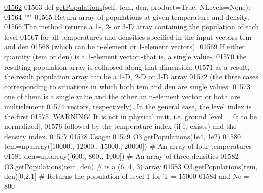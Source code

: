 \begin{DoxyCode}
\hypertarget{classpyneb_1_1core_1_1pynebcore_1_1_atom_l01562}{}\hyperlink{classpyneb_1_1core_1_1pynebcore_1_1_atom_aab7496403c8aaef40ab3b20b5c00e9f0}{01562} 
01563     \textcolor{keyword}{def }\hyperlink{classpyneb_1_1core_1_1pynebcore_1_1_atom_aab7496403c8aaef40ab3b20b5c00e9f0}{getPopulations}(self, tem, den, product=True, NLevels=None):
01564         \textcolor{stringliteral}{"""}
01565 \textcolor{stringliteral}{        Return array of populations at given temperature and density.}
01566 \textcolor{stringliteral}{        The method returns a 1-, 2- or 3-D array containing the population of each level }
01567 \textcolor{stringliteral}{            for all temperatures and densities specified in the input vectors tem and den }
01568 \textcolor{stringliteral}{            (which can be n-element or 1-element vectors).}
01569 \textcolor{stringliteral}{        If either quantity (tem or den) is a 1-element vector -that is, a single value-, }
01570 \textcolor{stringliteral}{            the resulting population array is collapsed along that dimension; }
01571 \textcolor{stringliteral}{            as a result, the result population array can be a 1-D, 2-D or 3-D array }
01572 \textcolor{stringliteral}{            (the three cases corresponding to situations in which both tem and den are single values; }
01573 \textcolor{stringliteral}{            one of them is a single value and the other an n-element vector; or both are multielement }
01574 \textcolor{stringliteral}{            vectors, respectively). In the general case, the level index is the first }
01575 \textcolor{stringliteral}{            [WARNING! It is not in physical unit, i.e. ground level = 0; to be normalized], }
01576 \textcolor{stringliteral}{            followed by the temperature index (if it exists) and the density index. }
01577 \textcolor{stringliteral}{}
01578 \textcolor{stringliteral}{        Usage:}
01579 \textcolor{stringliteral}{            O3.getPopulations(1e4, 1e2)}
01580 \textcolor{stringliteral}{            tem=np.array([10000., 12000., 15000., 20000]) # An array of four temperatures}
01581 \textcolor{stringliteral}{            den=np.array([600., 800., 1000])      # An array of three densities}
01582 \textcolor{stringliteral}{            O3.getPopulations(tem, den)           # is a (6, 4, 3) array}
01583 \textcolor{stringliteral}{            O3.getPopulations(tem, den)[0,2,1]    # Returns the population of level 1 for T = 15000 }
01584 \textcolor{stringliteral}{                                                    and Ne = 800}

\end{DoxyCode}
